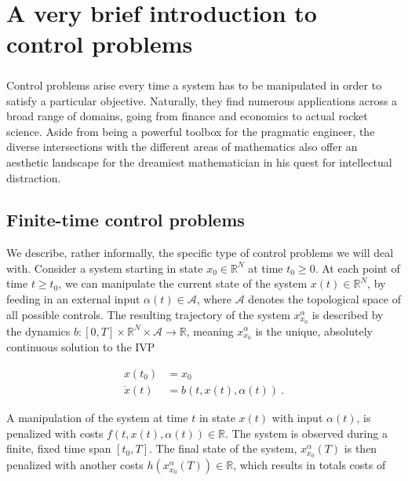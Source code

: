 \chapter{A very brief introduction to control problems} 

	\paragraph{}
	Control problems arise every time a system has to be manipulated in order to satisfy a particular objective. Naturally, they find numerous applications across a broad range of domains, going from finance and economics to actual rocket science. Aside from being a powerful toolbox for the pragmatic engineer, the diverse intersections with the different areas of mathematics also offer an aesthetic landscape for the dreamiest mathematician in his quest for intellectual distraction. 
	
	\section{Finite-time control problems}
	
	We describe, rather informally, the specific type of control problems we will deal with. Consider a system starting in state $ x_0 \in \mathbb{R}^N $ at time $ t_0 \geq 0 $. At each point of time $ t \geq t_0 $, we can manipulate the current state of the system $ x(t) \in \mathbb{R}^N $, by feeding in an external input $ \alpha(t) \in \mathcal{A} $, where $ \mathcal{A} $ denotes the topological space of all possible controls. The resulting trajectory of the system $ x^{\alpha}_{x_0} $ is described by the dynamics $ b : \left[ 0 , T \right] \times \mathbb{R}^N \times \mathcal{A} \to \mathbb{R} $, meaning $ x^{\alpha}_{x_0} $ is the unique, absolutely continuous solution to the IVP
	
	\begin{align*}
	x(t_0) &= x_0 \\
	\dot{x}(t) &= b(t, x(t), \alpha(t)) \ .
	\end{align*}
	
	A manipulation of the system at time $ t $ in state $ x(t) $ with input $ \alpha(t) $, is penalized with costs $ f(t, x(t), \alpha(t)) \in \mathbb{R} $. The system is observed during a finite, fixed time span $ \left[t_0, T \right] $. The final state of the system, $ x^{\alpha}_{x_0}(T) $ is then penalized with another costs $ h(x^{\alpha}_{x_0}(T)) \in \mathbb{R} $, which results in totals costs of
	
